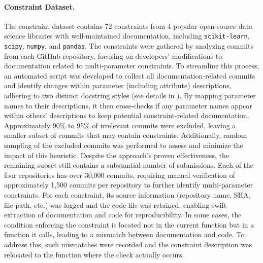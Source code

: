 \paragraph{Constraint Dataset.}
The constraint dataset contains 72 constraints from 4 popular open-source data science libraries with well-maintained documentation, including \texttt{scikit-learn}, \texttt{scipy}, \texttt{numpy}, and \texttt{pandas}. The constraints were gathered by analyzing commits from each GitHub repository, focusing on developers' modifications to documentation related to multi-parameter constraints. To streamline this process, an automated script was developed to collect all documentation-related commits and identify changes within parameter (including attribute) descriptions, adhering to two distinct docstring styles (see details in ). By mapping parameter names to their descriptions, it then cross-checks if any parameter names appear within others' descriptions to keep potential constraint-related documentation. Approximately 90\% to 95\% of irrelevant commits were excluded, leaving a smaller subset of commits that may contain constraints. Additionally, random sampling of the excluded commits was performed to assess and minimize the impact of this heuristic. Despite the approach's proven effectiveness, the remaining subset still contains a substantial number of submissions. Each of the four repositories has over 30,000 commits, requiring manual verification of approximately 1,500 commits per repository to further identify multi-parameter constraints. For each constraint, its source information (repository name, SHA, file path, etc.) was logged and the code file was retained, enabling swift extraction of documentation and code for reproducibility.
In some cases, the condition enforcing the constraint is located not in the current function but in a function it calls, leading to a mismatch between documentation and code. To address this, such mismatches were recorded and the constraint description was relocated to the function where the check actually occurs.




